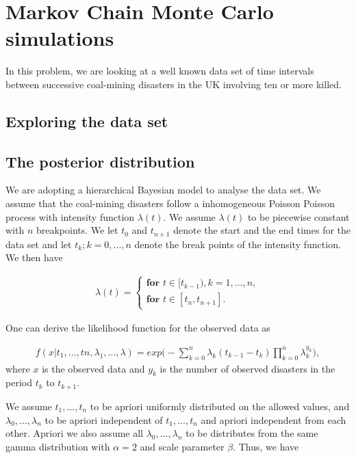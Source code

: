 \section{Markov Chain Monte Carlo simulations}

In this problem, we are looking at a well known data set of time intervals between successive coal-mining disasters in the UK involving ten or more killed. 

\subsection{Exploring the data set}

\subsection{The posterior distribution} \label{posterior}
We are adopting a hierarchical Bayesian model to analyse the data set. We assume that the coal-mining disasters follow a inhomogeneous Poisson Poisson process with intensity function $\lambda(t)$. We assume $\lambda(t)$ to be piecewise constant with $n$ breakpoints. We let $t_0$ and $t_{n+1}$ denote the start and the end times for the data set and let $t_k; k = 0,...,n$ denote the break points of the intensity function. We then have 


\begin{align}
    \lambda(t) = 
    \begin{cases}
        \textbf{for } t \in [t_{k-1}), k = 1,...,n, \\
        \textbf{for } t \in [t_n, t_{n+1}].
    \end{cases}
\end{align}

One can derive the likelihood function for the observed data as

\begin{align}
    f(x|t_1,...,tn,\lambda_1,...,\lambda) 
    = exp \Big( - \sum_{k = 0}^n \lambda_k (t_{k-1} - t_k) \prod_{k = 0}^n \lambda_k^{y_k} \Big), 
\end{align}
where $x$ is the observed data and $y_k$ is the number of observed disasters in the period $t_k$ to $t_{k+1}$. 

We assume $t_1,...,t_n$ to be apriori uniformly distributed on the allowed values, and $\lambda_0,...,\lambda_n$ to be apriori independent of $t_1,...,t_n$ and apriori independent from each other. Apriori we also assume all $\lambda_0,...,\lambda_n$ to be distributes from the same gamma distribution with $\alpha = 2$ and scale parameter $\beta$. Thus, we have 

